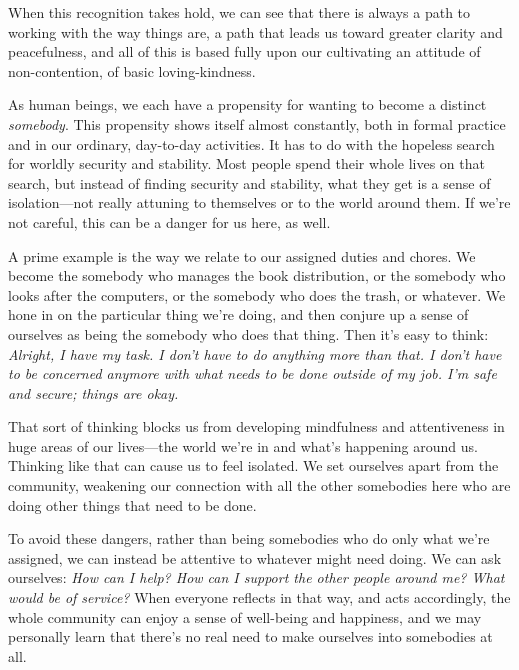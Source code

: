 When this recognition takes hold, we can see that there is always a 
path to working with the way things are, a path that leads us toward 
greater clarity and peacefulness, and all of this is based fully upon 
our cultivating an attitude of non-contention, of basic loving-kindness.


As human beings, we each have a propensity for wanting to become a 
distinct \emph{somebody}. This propensity shows itself almost 
constantly, both in formal practice and in our ordinary, day-to-day 
activities. It has to do with the hopeless search for worldly security 
and stability. Most people spend their whole lives on that search, but 
instead of finding security and stability, what they get is a sense of 
isolation---not really attuning to themselves or to the world around 
them. If we're not careful, this can be a danger for us here, as well.

A prime example is the way we relate to our assigned duties and chores. 
We become the somebody who manages the book distribution, or the 
somebody who looks after the computers, or the somebody who does the 
trash, or whatever. We hone in on the particular thing we're doing, and 
then conjure up a sense of ourselves as being the somebody who does 
that thing. Then it's easy to think: \emph{Alright, I have my task. I 
don't have to do anything more than that. I don't have to be concerned 
anymore with what needs to be done outside of my job. I'm safe and 
secure; things are okay.}

That sort of thinking blocks us from developing mindfulness and 
attentiveness in huge areas of our lives---the world we're in and 
what's happening around us. Thinking like that can cause us to feel 
isolated. We set ourselves apart from the community, weakening our 
connection with all the other somebodies here who are doing other 
things that need to be done.

To avoid these dangers, rather than being somebodies who do only what 
we're assigned, we can instead be attentive to whatever might need 
doing. We can ask ourselves: \emph{How can I help? How can I support 
the other people around me? What would be of service?} When everyone 
reflects in that way, and acts accordingly, the whole community can 
enjoy a sense of well-being and happiness, and we may personally learn 
that there's no real need to make ourselves into somebodies at all.

